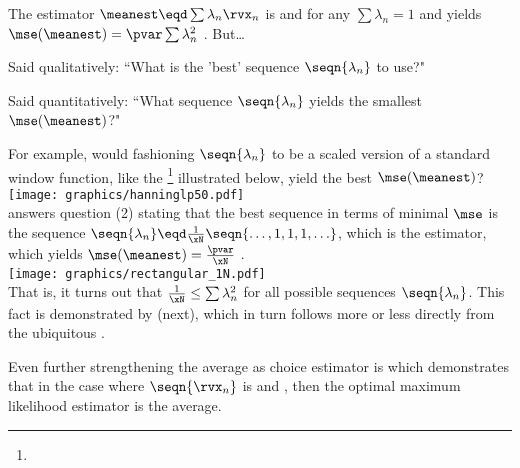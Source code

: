 The  estimator $\meanest\eqd\sum\lambda_n\rvx_n$
is  and  for any $\sum\lambda_n=1$ and
yields  $\mse(\meanest)=\pvar\sum\lambda_n^2$
.
But\ldots
\begin{enume}
  \item Said qualitatively: ``What is the 'best' sequence $\seqn{\lambda_n}$ to use?"
  \item Said quantitatively: ``What sequence $\seqn{\lambda_n}$ yields the smallest $\mse(\meanest)$?"
\end{enume}
For example, would fashioning $\seqn{\lambda_n}$ to be a scaled version of a standard 
window function, like the \footnote{
  }
illustrated below, yield the best $\mse(\meanest)$?
\\\indentx\texttt{[image: graphics/hanninglp50.pdf]}
\\
 answers question (2) stating
that the best sequence in terms of minimal $\mse$
is the sequence $\seqn{\lambda_n}\eqd\frac{1}{\xN}\seqn{\ldots,1,1,1,\ldots}$,
which is the  estimator,
which yields  $\mse(\meanest)= \frac{\pvar}{\xN}$ .
\\\indentx\texttt{[image: graphics/rectangular\_1N.pdf]}
\\
That is, it turns out that $\frac{1}{\xN}\le\sum\lambda_n^2$ for all possible sequences $\seqn{\lambda_n}$.
This fact is demonstrated by  (next),
which in turn follows more or less directly from the ubiquitous 
 .

Even further strengthening the average as choice estimator is 
which demonstrates that in the case where $\seqn{\rvx_n}$ is  and 
, then the optimal maximum likelihood estimator is the average.

